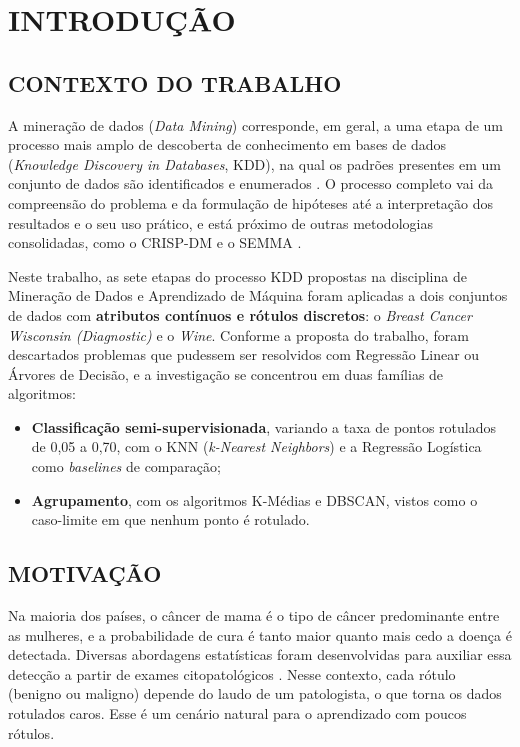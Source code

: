 \chapter[Introdução]{INTRODUÇÃO}

\section{CONTEXTO DO TRABALHO}

A mineração de dados (\textit{Data Mining}) corresponde, em geral, a uma etapa de um processo mais amplo de descoberta de conhecimento em bases de dados (\textit{Knowledge Discovery in Databases}, KDD), na qual os padrões presentes em um conjunto de dados são identificados e enumerados \citep{fayyad1996kdd}. O processo completo vai da compreensão do problema e da formulação de hipóteses até a interpretação dos resultados e o seu uso prático, e está próximo de outras metodologias consolidadas, como o CRISP-DM e o SEMMA \citep{azevedo2008kdd}.

Neste trabalho, as sete etapas do processo KDD propostas na disciplina de Mineração de Dados e Aprendizado de Máquina foram aplicadas a dois conjuntos de dados com \textbf{atributos contínuos e rótulos discretos}: o \textit{Breast Cancer Wisconsin (Diagnostic)} e o \textit{Wine}. Conforme a proposta do trabalho, foram descartados problemas que pudessem ser resolvidos com Regressão Linear ou Árvores de Decisão, e a investigação se concentrou em duas famílias de algoritmos:

\begin{itemize}
    \item \textbf{Classificação semi-supervisionada}, variando a taxa de pontos rotulados de 0,05 a 0,70, com o KNN (\textit{k-Nearest Neighbors}) e a Regressão Logística como \textit{baselines} de comparação;
    \item \textbf{Agrupamento}, com os algoritmos K-Médias e DBSCAN, vistos como o caso-limite em que nenhum ponto é rotulado.
\end{itemize}

\section{MOTIVAÇÃO}

Na maioria dos países, o câncer de mama é o tipo de câncer predominante entre as mulheres, e a probabilidade de cura é tanto maior quanto mais cedo a doença é detectada. Diversas abordagens estatísticas foram desenvolvidas para auxiliar essa detecção a partir de exames citopatológicos \citep{street1993nuclear, machinemantra_breast}. Nesse contexto, cada rótulo (benigno ou maligno) depende do laudo de um patologista, o que torna os dados rotulados caros. Esse é um cenário natural para o aprendizado com poucos rótulos.

